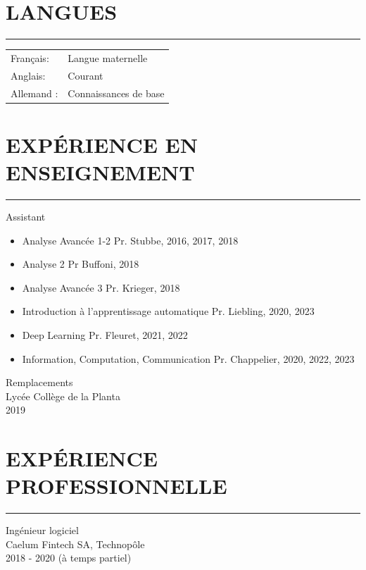 \documentclass{article}
\let\oldhrule\hrule
\renewcommand{\hrule}{\color{lightgray}\oldhrule\color{black}}
\newcommand{\rubric}[1]{
    \color{mediumgray}
    \section*{\montserratlight \large \MakeUppercase{#1}} 
    \hrule
    \vspace{4mm}
    \raggedright
}
\begin{document}

\begin{minipage}[t]{0.3\textwidth}

  \rubric{Langues}
  \color{deepgray}
  \small
  \begin{tabular}{@{}ll@{}}
    Français:  & Langue maternelle     \\
    Anglais:   & Courant               \\
    Allemand : & Connaissances de base
  \end{tabular}

\end{minipage}\hfill
\begin{minipage}[t]{0.65\textwidth}

  \rubric{Expérience en Enseignement}

  \color{deepgray}
  \large Assistant
  \color{mediumgray} \small
  \begin{itemize}
    \item \color{deepgray}Analyse Avancée 1-2 \color{mediumgray} Pr. Stubbe, 2016, 2017, 2018
    \item \color{deepgray}Analyse 2 \color{mediumgray} Pr Buffoni, 2018
    \item \color{deepgray}Analyse Avancée 3 \color{mediumgray} Pr. Krieger, 2018
    \item \color{deepgray}Introduction à l'apprentissage automatique  \color{mediumgray} Pr. Liebling, 2020, 2023
    \item \color{deepgray}Deep Learning \color{mediumgray} Pr. Fleuret, 2021, 2022
    \item \color{deepgray}Information, Computation, Communication  \color{mediumgray} Pr. Chappelier, 2020, 2022, 2023
  \end{itemize}

  \vspace{4mm}
  \color{deepgray}
  \large Remplacements \\
  \color{mediumgray} \small
  Lycée Collège de la Planta \\
  2019
  \rubric{Expérience professionnelle}

  \color{deepgray}
  \large Ingénieur logiciel \\
  \color{mediumgray} \small
  Caelum Fintech SA, Technopôle \\
  2018 - 2020 (à temps partiel)
  \vspace{4mm}
\end{minipage}
\end{document}
